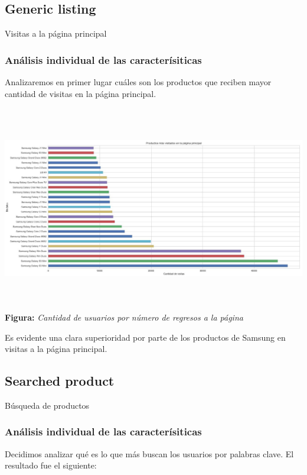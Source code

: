 \documentclass[titlepage,a4paper]{article}
\begin{document}
	\subsection{Generic listing}
	Visitas a la página principal
	
	\subsubsection{Análisis individual de las caracterísiticas}
	Analizaremos en primer lugar cuáles son los productos que reciben mayor cantidad de visitas en la página principal.
	
	\begin{center}
    \includegraphics[width=14cm, height=9cm]{productosMasVisitadosEnLaPaginaPrincipal.jpg}\\
	\textbf{Figura:}  \textit{Cantidad de usuarios por número de regresos a la página}
	\end{center}
	
	Es evidente una clara superioridad por parte de los productos de Samsung en visitas a la página principal.
	
	\subsection{Searched product}
	Búsqueda de productos
	\subsubsection{Análisis individual de las caracterísiticas}
	Decidimos analizar qué es lo que más buscan los usuarios por palabras clave. El resultado fue el siguiente:
	
\end{document}
